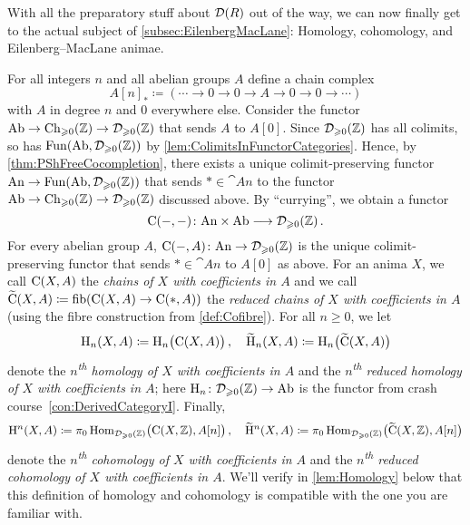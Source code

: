 With all the preparatory stuff about $\mathcal{D}(R)$ out of the way, we can now finally get to the actual subject of \cref{subsec:EilenbergMacLane}: Homology, cohomology, and Eilenberg--MacLane animae.
\begin{con}\label{con:Homology}
	For all integers $n$ and all abelian groups $A$ define a chain complex
	\begin{equation*}
		A[n]_*\coloneqq \left(\dotsb\rightarrow 0\rightarrow 0\rightarrow A\rightarrow 0\rightarrow 0\rightarrow \dotsb\right)
	\end{equation*}
	with $A$ in degree $n$ and $0$ everywhere else. Consider the functor $\mathrm{Ab}\rightarrow\operatorname{Ch}_{\geqslant 0}(\mathbb{Z})\rightarrow\mathcal{D}_{\geqslant 0}(\mathbb{Z})$ that sends $A$ to $A[0]$. Since $\mathcal{D}_{\geqslant 0}(\mathbb{Z})$ has all colimits, so has $\operatorname{Fun}(\mathrm{Ab},\mathcal{D}_{\geqslant 0}(\mathbb{Z}))$ by \cref{lem:ColimitsInFunctorCategories}. Hence, by \cref{thm:PShFreeCocompletion}, there exists a unique colimit-preserving functor $\mathrm{An}\rightarrow\operatorname{Fun}(\mathrm{Ab},\mathcal{D}_{\geqslant 0}(\mathbb{Z}))$ that sends $*\in\cat{An}$ to the functor $\mathrm{Ab}\rightarrow\operatorname{Ch}_{\geqslant 0}(\mathbb{Z})\rightarrow\mathcal{D}_{\geqslant 0}(\mathbb{Z})$ discussed above. By \enquote{currying}, we obtain a functor
	\begin{equation*}
		\operatorname{C}(-,-)\colon \mathrm{An}\times\mathrm{Ab}\longrightarrow \mathcal{D}_{\geqslant 0}(\mathbb{Z})\,.
	\end{equation*} 
	For every abelian group $A$, $\operatorname{C}(-,A)\colon \mathrm{An}\rightarrow\mathcal{D}_{\geqslant 0}(\mathbb{Z})$ is the unique colimit-preserving functor that sends $*\in\cat{An}$ to $A[0]$ as above. For an anima $X$, we call $\operatorname{C}(X,A)$ the \emph{chains of $X$ with coefficients in $A$} and we call $\widetilde{\operatorname{C}}(X,A)\coloneqq \operatorname{fib}(\operatorname{C}(X,A)\rightarrow\operatorname{C}(*,A))$ the \emph{reduced chains of $X$ with coefficients in $A$} (using the fibre construction from \cref{def:Cofibre}). For all $n\geqslant 0$, we let
	\begin{equation*}
		\mathrm{H}_n(X,A)\coloneqq \mathrm{H}_n\bigl(\operatorname{C}(X,A)\bigr)\,,\quad \widetilde{\mathrm{H}}_n(X,A)\coloneqq\mathrm{H}_n\bigl(\widetilde{\operatorname{C}}(X,A)\bigr)
	\end{equation*}
	denote the \emph{$n$\textsuperscript{th} homology of $X$ with coefficients in $A$} and the \emph{$n$\textsuperscript{th} reduced homology of $X$ with coefficients in $A$}; here $\mathrm{H}_n\colon \mathcal{D}_{\geqslant 0}(\mathbb{Z})\rightarrow\mathrm{Ab}$ is the functor from crash course~\cref{con:DerivedCategoryI}. Finally,
	\begin{equation*}
		\mathrm{H}^n(X,A)\coloneqq \pi_0\operatorname{Hom}_{\mathcal{D}_{\geqslant 0}(\mathbb{Z})}\bigl(\operatorname{C}(X,\mathbb{Z}),A[n]\bigr)\,,\quad\widetilde{\mathrm{H}}^n(X,A)\coloneqq \pi_0\operatorname{Hom}_{\mathcal{D}_{\geqslant 0}(\mathbb{Z})}\bigl(\widetilde{\operatorname{C}}(X,\mathbb{Z}),A[n]\bigr)
	\end{equation*}
	denote the \emph{$n$\textsuperscript{th} cohomology of $X$ with coefficients in $A$} and the \emph{$n$\textsuperscript{th} reduced cohomology of $X$ with coefficients in $A$}. We'll verify in \cref{lem:Homology} below that this definition of homology and cohomology is compatible with the one you are familiar with.
	

\end{con}
